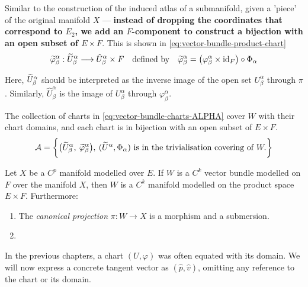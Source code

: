 \documentclass[../main-v2-manifolds.tex]{subfiles}
\begin{document}
Similar to the construction of the induced atlas of a submanifold, given a 'piece' of the original manifold $X$ --- \textbf{instead of dropping the coordinates that correspond to $E_2$, we add an $F$-component to construct a bijection with an open subset of $E\times F$}. This is shown in \cref{eq:vector-bundle-product-chart} 
\begin{equation}\label{eq:vector-bundle-product-chart}
    \wig{\varphi}^{\alpha}_\beta:\wig{U}^\alpha_\beta\longrightarrow\hat{U}^\alpha_\beta \times F \qqtext{defined by} \wig{\varphi}^{\alpha}_\beta = \qty(\varphi^\alpha_\beta\times \id{F})\circ \Phi_\alpha
\end{equation}
\begin{remark}
    Here, $\widetilde{U}^\alpha_\beta$ should be interpreted as the inverse image of the open set $U^\alpha_\beta$ through $\pi$. Similarly, $\hat{U}^\alpha_\beta$ is the image of $U^\alpha_\beta$ through $\varphi^\alpha_\beta$.
\end{remark}
The collection of charts in \cref{eq:vector-bundle-charts-ALPHA} cover $W$ with their chart domains, and each chart is in bijection with an open subset of $E\times F$.
\begin{equation}\label{eq:vector-bundle-charts-ALPHA}
    \mathcal{A} =\biggl\{{\qty\big(\widetilde{U}^\alpha_\beta,\: \widetilde{\varphi}^\alpha_\beta),\:  (\widetilde{U}^\alpha,\Phi_\alpha) \text{ is in the trivialisation covering of  } W.}\biggr\}
\end{equation}


\begin{wts}\label{prop:structure-of-vector-bundle}
    Let $X$ be a $C^p$ manifold modelled over $E$. If $W$ is a $C^k$ vector bundle modelled on $F$ over the manifold $X$, then $W$ is a $C^k$ manifold modelled on the product space $E\times F$. Furthermore:
    \begin{enumerate}
        \item The \emph{canonical projection} $\pi: W\to X$ is a morphism and a submersion.
        \item 
    \end{enumerate}
\end{wts}
% 


In the previous chapters, a chart $(U,\varphi)$ was often equated with its domain. We will now express a concrete tangent vector as $(\hat{p}, \hat{v})$, omitting any reference to the chart or its domain. \\
\end{document}
